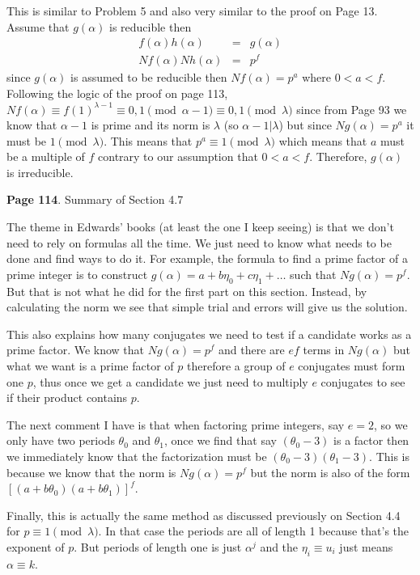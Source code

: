 \documentclass[aps,preprint,preprintnumbers,nofootinbib,showpacs,prd]{revtex4-1}
\newcommand{\nbea}{\begin{eqnarray*}}
\newcommand{\neea}{\end{eqnarray*}}
\begin{document}
This is similar to Problem 5 and also very similar to the proof on Page 13. Assume that $g(\alpha)$ is reducible then
%
\nbea
f(\alpha) h(\alpha) & = & g(\alpha) \\
Nf(\alpha) Nh(\alpha) & = & p^f
\neea
%
since $g(\alpha)$ is assumed to be reducible then $Nf(\alpha) = p^a$ where $0 < a < f$. Following the logic of the proof on page 113, $Nf(\alpha) \equiv f(1)^{\lambda-1} \equiv 0,1 \pmod{\alpha - 1} \equiv 0,1 \pmod{\lambda}$ since from Page 93 we know that $\alpha - 1$ is prime and its norm is $\lambda$ (so $\alpha - 1|\lambda$) but since $Ng(\alpha) = p^a$ it must be $1 \pmod{\lambda}$. This means that $p^a \equiv 1 \pmod{\lambda}$ which means that $a$ must be a multiple of $f$ contrary to our assumption that $0 < a < f$. Therefore, $g(\alpha)$ is irreducible.

{\bf Page 114}. Summary of Section 4.7

The theme in Edwards' books (at least the one I keep seeing) is that we don't need to rely on formulas all the time. We just need to know what needs to be done and find ways to do it. For example, the formula to find a prime factor of a prime integer is to construct $g(\alpha) = a + b\eta_0 + c\eta_1 + \dots$ such that $Ng(\alpha) = p^f$. But that is not what he did for the first part on this section. Instead, by calculating the norm we see that simple trial and errors will give us the solution.

This also explains how many conjugates we need to test if a candidate works as a prime factor. We know that $Ng(\alpha) = p^f$ and there are $ef$ terms in $Ng(\alpha)$ but what we want is a prime factor of $p$ therefore a group of $e$ conjugates must form one $p$, thus once we get a candidate we just need to multiply $e$ conjugates to see if their product contains $p$.

The next comment I have is that when factoring prime integers, say $e = 2$, so we only have two periods $\theta_0$ and $\theta_1$, once we find that say $(\theta_0 - 3)$ is a factor then we immediately know that the factorization must be $(\theta_0 - 3)(\theta_1 - 3)$. This is because we know that the norm is $Ng(\alpha) = p^f$ but the norm is also of the form $[(a + b\theta_0)(a + b\theta_1)]^f$.

Finally, this is actually the same method as discussed previously on Section 4.4 for $p \equiv 1 \pmod{\lambda}$. In that case the periods are all of length 1 because that's the exponent of $p$. But periods of length one is just $\alpha^j$ and the $\eta_i \equiv u_i$ just means $\alpha \equiv k$.
\end{document}
